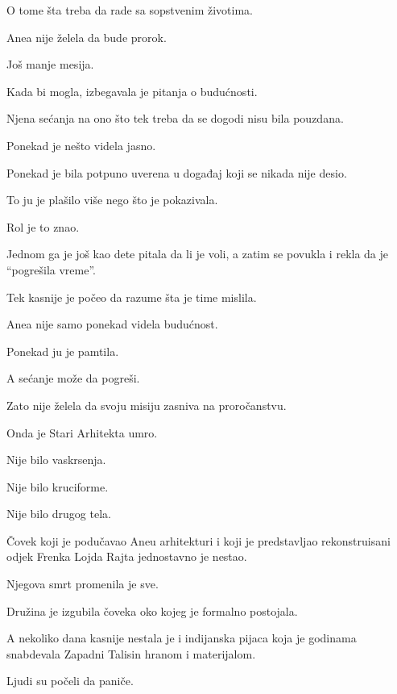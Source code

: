O tome šta treba da rade sa sopstvenim životima.

\bigskip

Anea nije želela da bude prorok.

Još manje mesija.

Kada bi mogla, izbegavala je pitanja o budućnosti.

Njena sećanja na ono što tek treba da se dogodi nisu bila pouzdana.

Ponekad je nešto videla jasno.

Ponekad je bila potpuno uverena u događaj koji se nikada nije desio.

\bigskip

To ju je plašilo više nego što je pokazivala.

\bigskip

Rol je to znao.

Jednom ga je još kao dete pitala da li je voli, a zatim se povukla i rekla da je ``pogrešila vreme''.

Tek kasnije je počeo da razume šta je time mislila.

Anea nije samo ponekad videla budućnost.

Ponekad ju je pamtila.

A sećanje može da pogreši.

\bigskip

Zato nije želela da svoju misiju zasniva na proročanstvu.

\bigskip

Onda je Stari Arhitekta umro.

\bigskip

Nije bilo vaskrsenja.

Nije bilo kruciforme.

Nije bilo drugog tela.

\bigskip

Čovek koji je podučavao Aneu arhitekturi i koji je predstavljao rekonstruisani odjek Frenka Lojda Rajta jednostavno je nestao.

\bigskip

Njegova smrt promenila je sve.

\bigskip

Družina je izgubila čoveka oko kojeg je formalno postojala.

A nekoliko dana kasnije nestala je i indijanska pijaca koja je godinama snabdevala Zapadni Talisin hranom i materijalom.

\bigskip

Ljudi su počeli da paniče.

